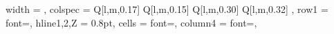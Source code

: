 \documentclass[11pt,a4paper]{article}
\newcommand{\tbd}{\textcolor{gray}{\emph{[TBD]}}}
\begin{document}
\begin{table}[h]
\centering
\caption{Human studies of the association between the gut microbiota and GVHD with
publicly available 16S sequencing and clinical metadata included in the analytic sub-cohort.}
\begin{tblr}{
  width = \linewidth,
  colspec = {Q[l,m,0.17\linewidth] Q[l,m,0.15\linewidth] Q[l,m,0.30\linewidth] Q[l,m,0.32\linewidth] },
  row{1} = {font=\bfseries}, %
  hline{1,2,Z} = {0.8pt},    %
  cells = {font=\small},
  column{4} = {font=\footnotesize}, %
}


\end{tblr}
\end{table}
\end{document}
